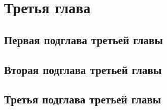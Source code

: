 \section{Третья глава}
\subsection{Первая подглава третьей главы}
\subsection{Вторая подглава третьей главы}
\subsection{Третья подглава третьей главы}
